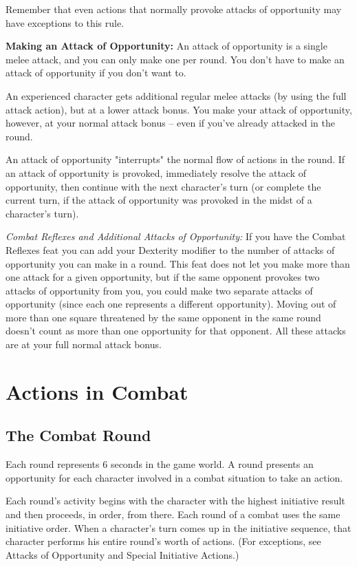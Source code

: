 Remember that even actions that normally provoke attacks of opportunity may have exceptions to this rule.

\textbf{Making an Attack of Opportunity:} An attack of opportunity is a single melee attack, and you can only make one per round. You don't have to make an attack of opportunity if you don't want to.

An experienced character gets additional regular melee attacks (by using the full attack action), but at a lower attack bonus. You make your attack of opportunity, however, at your normal attack bonus -- even if you've already attacked in the round.

An attack of opportunity "interrupts" the normal flow of actions in the round. If an attack of opportunity is provoked, immediately resolve the attack of opportunity, then continue with the next character's turn (or complete the current turn, if the attack of opportunity was provoked in the midst of a character's turn).

\textit{Combat Reflexes and Additional Attacks of Opportunity:} If you have the Combat Reflexes feat you can add your Dexterity modifier to the number of attacks of opportunity you can make in a round. This feat does not let you make more than one attack for a given opportunity, but if the same opponent provokes two attacks of opportunity from you, you could make two separate attacks of opportunity (since each one represents a different opportunity). Moving out of more than one square threatened by the same opponent in the same round doesn't count as more than one opportunity for that opponent. All these attacks are at your full normal attack bonus.

\section{Actions in Combat}

\subsection{The Combat Round}

Each round represents 6 seconds in the game world. A round presents an opportunity for each character involved in a combat situation to take an action. 

Each round's activity begins with the character with the highest initiative result and then proceeds, in order, from there. Each round of a combat uses the same initiative order. When a character's turn comes up in the initiative sequence, that character performs his entire round's worth of actions. (For exceptions, see Attacks of Opportunity and Special Initiative Actions.)

